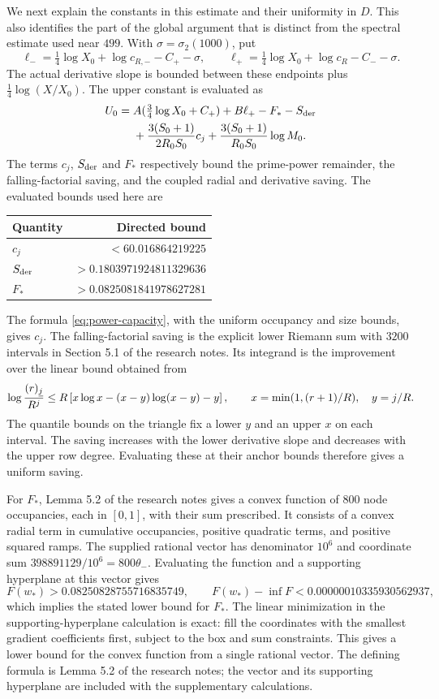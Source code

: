 We next explain the constants in this estimate and their uniformity in $D$. This also identifies the part of the global argument that is distinct from the spectral estimate used near $499$. With $\sigma=\sigma_2(1000)$, put
\[
 \ell_- =\tfrac14\log X_0+\log c_{R,-} -C_+-\sigma,
 \qquad
 \ell_+ =\tfrac14\log X_0+\log c_R-C_- -\sigma.
\]
The actual derivative slope is bounded between these endpoints plus
$\tfrac14\log(X/X_0)$. The upper constant is evaluated as
\begin{align}
 U_0={}& A(\tfrac34\log X_0+C_+)+B\ell_+
       -F_*-S_{\rm der}\notag\\
 &+\frac{3(S_0+1)}{2R_0S_0}c_j
       +\frac{3(S_0+1)}{R_0S_0}\log M_0.\label{eq:tail-upper-constant}
\end{align}
The terms $c_j$, $S_{\rm der}$ and $F_*$ respectively bound the prime-power remainder, the falling-factorial saving, and the coupled radial and derivative saving. The evaluated bounds used here are
\begin{center}
\begin{tabular}{lr}
\toprule
Quantity & Directed bound\\
\midrule
$c_j$ & $<60.016864219225$\\
$S_{\rm der}$ & $>0.1803971924811329636$\\
$F_*$ & $>0.0825081841978627281$\\
\bottomrule
\end{tabular}
\end{center}
The formula \eqref{eq:power-capacity}, with the uniform occupancy and size bounds, gives $c_j$. The falling-factorial saving is the explicit lower Riemann sum with $3200$ intervals in Section 5.1 of the research notes. Its integrand is the improvement over the linear bound obtained from
\[
 \log\frac{(r)_{\underline{j}}}{R^j}
 \leq R\left[x\log x-(x-y)\log(x-y)-y\right],
 \qquad x=\min(1,(r+1)/R),\quad y=j/R.
\]
The quantile bounds on the triangle fix a lower $y$ and an upper $x$ on each interval. The saving increases with the lower derivative slope and decreases with the upper row degree. Evaluating these at their anchor bounds therefore gives a uniform saving.

For $F_*$, Lemma 5.2 of the research notes gives a convex function of $800$ node occupancies, each in $[0,1]$, with their sum prescribed. It consists of a convex radial term in cumulative occupancies, positive quadratic terms, and positive squared ramps. The supplied rational vector has denominator $10^6$ and coordinate sum $398891129/10^6=800\theta_-$. Evaluating the function and a supporting hyperplane at this vector gives
\[
 F(w_*)>0.08250828755716835749,\qquad
 F(w_*)-\inf F<0.00000010335930562937,
\]
which implies the stated lower bound for $F_*$. The linear minimization in the supporting-hyperplane calculation is exact: fill the coordinates with the smallest gradient coefficients first, subject to the box and sum constraints. This gives a lower bound for the convex function from a single rational
vector. The defining formula is Lemma 5.2 of the research notes; the vector and
its supporting hyperplane are included with the supplementary calculations.


